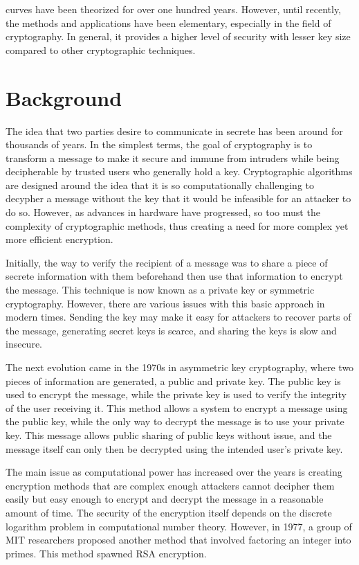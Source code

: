 \documentclass[journal,onecolumn]{IEEEtran}
\begin{document}
 curves have been theorized for over one hundred years. However, until recently, the methods and applications have been elementary, especially in the field of cryptography. In general, it provides a higher level of security with lesser key size compared to other cryptographic techniques.

\section{Background}

The idea that two parties desire to communicate in secrete has been around for thousands of years. In the simplest terms, the goal of cryptography is to transform a message to make it secure and immune from intruders while being decipherable by trusted users who generally hold a key. Cryptographic algorithms are designed around the idea that it is so computationally challenging to decypher a message without the key that it would be infeasible for an attacker to do so. However, as advances in hardware have progressed, so too must the complexity of cryptographic methods, thus creating a need for more complex yet more efficient encryption. 

Initially, the way to verify the recipient of a message was to share a piece of secrete information with them beforehand then use that information to encrypt the message. This technique is now known as a private key or symmetric cryptography. However, there are various issues with this basic approach in modern times. Sending the key may make it easy for attackers to recover parts of the message, generating secret keys is scarce, and sharing the keys is slow and insecure. 

The next evolution came in the 1970s in asymmetric key cryptography, where two pieces of information are generated, a public and private key. The public key is used to encrypt the message, while the private key is used to verify the integrity of the user receiving it. This method allows a system to encrypt a message using the public key, while the only way to decrypt the message is to use your private key. This message allows public sharing of public keys without issue, and the message itself can only then be decrypted using the intended user's private key.

The main issue as computational power has increased over the years is creating encryption methods that are complex enough attackers cannot decipher them easily but easy enough to encrypt and decrypt the message in a reasonable amount of time. The security of the encryption itself depends on the discrete logarithm problem in computational number theory. However, in 1977, a group of MIT researchers proposed another method that involved factoring an integer into primes. This method spawned RSA encryption.
\end{document}
